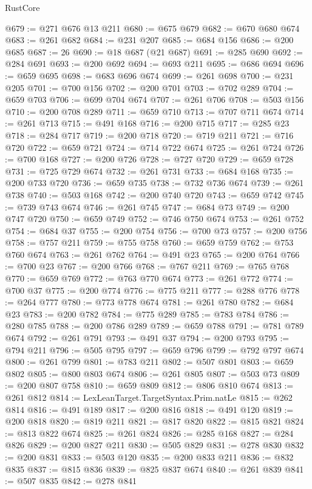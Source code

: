 \begin{lexlean}{RustCore}
\begin{coremodule}
@679 := @271 @676 @13 @211
@680 := @675 @679
@682 := @670 @680 @674
@683 := @261 @682
@684 := @231 @207
@685 := @684 @156
@686 := @200 @685
@687 := 26
@690 := @18 @687 (@21 @687)
@691 := @285 @690
@692 := @284 @691
@693 := @200 @692
@694 := @693 @211
@695 := @686 @694
@696 := @659 @695
@698 := @683 @696 @674
@699 := @261 @698
@700 := @231 @205
@701 := @700 @156
@702 := @200 @701
@703 := @702 @289
@704 := @659 @703
@706 := @699 @704 @674
@707 := @261 @706
@708 := @503 @156
@710 := @200 @708 @289
@711 := @659 @710
@713 := @707 @711 @674
@714 := @261 @713
@715 := @491 @168
@716 := @200 @715
@717 := @285 @23
@718 := @284 @717
@719 := @200 @718
@720 := @719 @211
@721 := @716 @720
@722 := @659 @721
@724 := @714 @722 @674
@725 := @261 @724
@726 := @700 @168
@727 := @200 @726
@728 := @727 @720
@729 := @659 @728
@731 := @725 @729 @674
@732 := @261 @731
@733 := @684 @168
@735 := @200 @733 @720
@736 := @659 @735
@738 := @732 @736 @674
@739 := @261 @738
@740 := @503 @168
@742 := @200 @740 @720
@743 := @659 @742
@745 := @739 @743 @674
@746 := @261 @745
@747 := @684 @73
@749 := @200 @747 @720
@750 := @659 @749
@752 := @746 @750 @674
@753 := @261 @752
@754 := @684 @37
@755 := @200 @754
@756 := @700 @73
@757 := @200 @756
@758 := @757 @211
@759 := @755 @758
@760 := @659 @759
@762 := @753 @760 @674
@763 := @261 @762
@764 := @491 @23
@765 := @200 @764
@766 := @700 @23
@767 := @200 @766
@768 := @767 @211
@769 := @765 @768
@770 := @659 @769
@772 := @763 @770 @674
@773 := @261 @772
@774 := @700 @37
@775 := @200 @774
@776 := @775 @211
@777 := @288 @776
@778 := @264 @777
@780 := @773 @778 @674
@781 := @261 @780
@782 := @684 @23
@783 := @200 @782
@784 := @775 @289
@785 := @783 @784
@786 := @280 @785
@788 := @200 @786 @289
@789 := @659 @788
@791 := @781 @789 @674
@792 := @261 @791
@793 := @491 @37
@794 := @200 @793
@795 := @794 @211
@796 := @505 @795
@797 := @659 @796
@799 := @792 @797 @674
@800 := @261 @799
@801 := @783 @211
@802 := @507 @801
@803 := @659 @802
@805 := @800 @803 @674
@806 := @261 @805
@807 := @503 @73
@809 := @200 @807 @758
@810 := @659 @809
@812 := @806 @810 @674
@813 := @261 @812
@814 := LexLeanTarget.TargetSyntax.Prim.natLe
@815 := @262 @814
@816 := @491 @189
@817 := @200 @816
@818 := @491 @120
@819 := @200 @818
@820 := @819 @211
@821 := @817 @820
@822 := @815 @821
@824 := @813 @822 @674
@825 := @261 @824
@826 := @285 @168
@827 := @284 @826
@829 := @200 @827 @211
@830 := @505 @829
@831 := @278 @830
@832 := @200 @831
@833 := @503 @120
@835 := @200 @833 @211
@836 := @832 @835
@837 := @815 @836
@839 := @825 @837 @674
@840 := @261 @839
@841 := @507 @835
@842 := @278 @841

\end{coremodule}
\end{lexlean}
